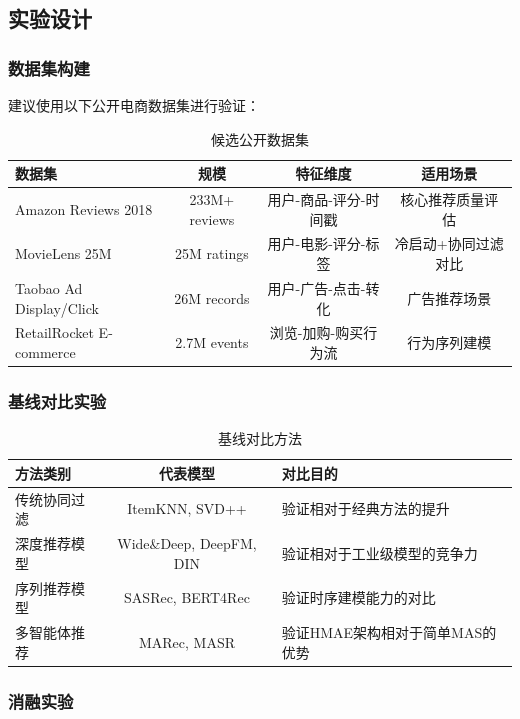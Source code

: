 \documentclass[11pt,a4paper]{ctexart}
\theoremstyle{remark}
\begin{document}
\subsection{实验设计}

\subsubsection{数据集构建}

建议使用以下公开电商数据集进行验证：

\begin{table}[H]
\centering
\caption{候选公开数据集}
\begin{tabular}{lccc}
\toprule
\textbf{数据集} & \textbf{规模} & \textbf{特征维度} & \textbf{适用场景} \\
\midrule
Amazon Reviews 2018 & 233M+ reviews & 用户-商品-评分-时间戳 & 核心推荐质量评估 \\
MovieLens 25M & 25M ratings & 用户-电影-评分-标签 & 冷启动+协同过滤对比 \\
Taobao Ad Display/Click & 26M records & 用户-广告-点击-转化 & 广告推荐场景 \\
RetailRocket E-commerce & 2.7M events & 浏览-加购-购买行为流 & 行为序列建模 \\
\bottomrule
\end{tabular}
\end{table}

\subsubsection{基线对比实验}

\begin{table}[H]
\centering
\caption{基线对比方法}
\begin{tabular}{lcp{5cm}}
\toprule
\textbf{方法类别} & \textbf{代表模型} & \textbf{对比目的} \\
\midrule
传统协同过滤 & ItemKNN, SVD++ & 验证相对于经典方法的提升 \\
深度推荐模型 & Wide\&Deep, DeepFM, DIN & 验证相对于工业级模型的竞争力 \\
序列推荐模型 & SASRec, BERT4Rec & 验证时序建模能力的对比 \\
多智能体推荐 & MARec, MASR & 验证HMAE架构相对于简单MAS的优势 \\
\bottomrule
\end{tabular}
\end{table}

\subsubsection{消融实验}
\end{document}

